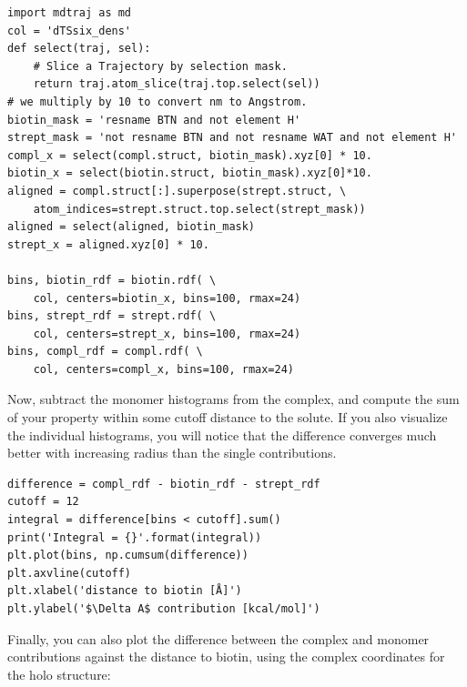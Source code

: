 \documentclass[9pt,tutorial]{livecoms}
\begin{document}
\begin{lstlisting}[style=python]
import mdtraj as md
col = 'dTSsix_dens'
def select(traj, sel):
    # Slice a Trajectory by selection mask.
    return traj.atom_slice(traj.top.select(sel))
# we multiply by 10 to convert nm to Angstrom.
biotin_mask = 'resname BTN and not element H'
strept_mask = 'not resname BTN and not resname WAT and not element H'
compl_x = select(compl.struct, biotin_mask).xyz[0] * 10.
biotin_x = select(biotin.struct, biotin_mask).xyz[0]*10.
aligned = compl.struct[:].superpose(strept.struct, \
    atom_indices=strept.struct.top.select(strept_mask))
aligned = select(aligned, biotin_mask)
strept_x = aligned.xyz[0] * 10.

bins, biotin_rdf = biotin.rdf( \
    col, centers=biotin_x, bins=100, rmax=24)
bins, strept_rdf = strept.rdf( \
    col, centers=strept_x, bins=100, rmax=24)
bins, compl_rdf = compl.rdf( \
    col, centers=compl_x, bins=100, rmax=24)
\end{lstlisting}
Now, subtract the monomer histograms from the complex, and compute the sum of your property within some cutoff distance to the solute.
If you also visualize the individual histograms, you will notice that the difference converges much better with increasing radius than the single contributions.

\begin{lstlisting}[style=python]
difference = compl_rdf - biotin_rdf - strept_rdf
cutoff = 12
integral = difference[bins < cutoff].sum()
print('Integral = {}'.format(integral))
plt.plot(bins, np.cumsum(difference))
plt.axvline(cutoff)
plt.xlabel('distance to biotin [Å]')
plt.ylabel('$\Delta A$ contribution [kcal/mol]')
\end{lstlisting}
Finally, you can also plot the difference between the complex and monomer contributions against the distance to biotin, using the complex coordinates for the holo structure:
\end{document}
